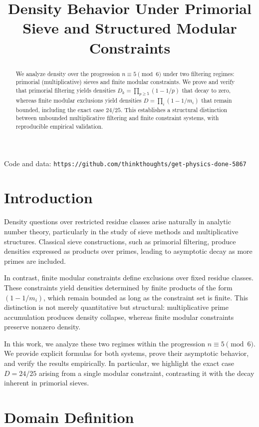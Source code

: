 \documentclass[11pt]{article}
\title{Density Behavior Under Primorial Sieve and Structured Modular Constraints}
\author{}
\date{}
\begin{document}
\maketitle

\begin{abstract}
We analyze density over the progression $n \equiv 5 \pmod{6}$ under two filtering regimes: primorial (multiplicative) sieves and finite modular constraints. We prove and verify that primorial filtering yields densities $D_k = \prod_{p \ge 5}(1 - 1/p)$ that decay to zero, whereas finite modular exclusions yield densities $D = \prod_i (1 - 1/m_i)$ that remain bounded, including the exact case $24/25$. This establishes a structural distinction between unbounded multiplicative filtering and finite constraint systems, with reproducible empirical validation.
\end{abstract}

\noindent Code and data: \texttt{https://github.com/thinkthoughts/get-physics-done-5867}

\section{Introduction}

Density questions over restricted residue classes arise naturally in analytic number theory, particularly in the study of sieve methods and multiplicative structures. Classical sieve constructions, such as primorial filtering, produce densities expressed as products over primes, leading to asymptotic decay as more primes are included.

In contrast, finite modular constraints define exclusions over fixed residue classes. These constraints yield densities determined by finite products of the form $(1 - 1/m_i)$, which remain bounded as long as the constraint set is finite. This distinction is not merely quantitative but structural: multiplicative prime accumulation produces density collapse, whereas finite modular constraints preserve nonzero density.

In this work, we analyze these two regimes within the progression $n \equiv 5 \pmod{6}$. We provide explicit formulas for both systems, prove their asymptotic behavior, and verify the results empirically. In particular, we highlight the exact case $D = 24/25$ arising from a single modular constraint, contrasting it with the decay inherent in primorial sieves.

\section{Domain Definition}
\end{document}
